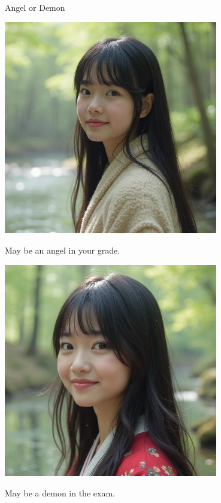 \documentclass{beamer}
\begin{document}
\begin{frame}{Angel or Demon}
\begin{minipage}{0.45\textwidth}
\begin{center}
\includegraphics[width=0.7\textwidth]{heal.png}
\end{center}
\begin{center}
May be an angel in your grade.
\end{center}
\end{minipage}
\hfill
\begin{minipage}{0.45\textwidth}
\begin{center}
\includegraphics[width=0.7\textwidth]{kill.png}
\end{center}
\begin{center}
May be a demon in the exam.
\end{center}
\end{minipage}
\end{frame}
\end{document}
